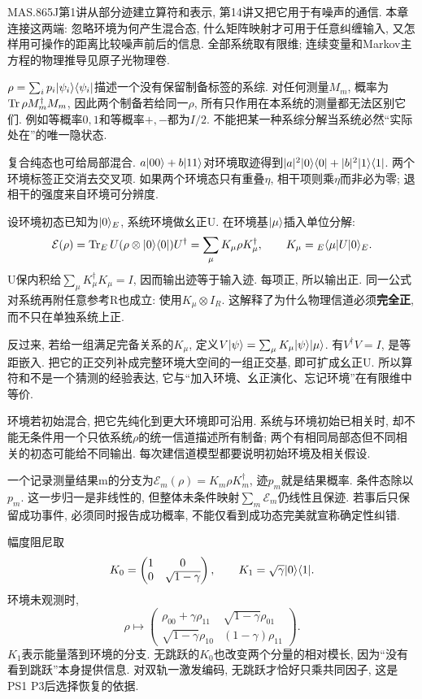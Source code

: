 MAS.865J第1讲从部分迹建立算符和表示, 第14讲又把它用于有噪声的通信. 本章连接这两端: 忽略环境为何产生混合态, 什么矩阵映射才可用于任意纠缠输入, 又怎样用可操作的距离比较噪声前后的信息. 全部系统取有限维; 连续变量和Markov主方程的物理推导见原子光物理卷.

$\rho=\sum_ip_i\lvert \psi_i\rangle\langle \psi_i\rvert$描述一个没有保留制备标签的系综. 对任何测量$M_m$, 概率为$\operatorname{Tr}\rho M_m^\dagger M_m$, 因此两个制备若给同一$\rho$, 所有只作用在本系统的测量都无法区别它们. 例如等概率$0,1$和等概率$+,-$都为$I/2$. 不能把某一种系综分解当系统必然“实际处在”的唯一隐状态.

复合纯态也可给局部混合. $a\lvert 00\rangle+b\lvert 11\rangle$对环境取迹得到$|a|^2\lvert 0\rangle\langle 0\rvert+|b|^2\lvert 1\rangle\langle 1\rvert$. 两个环境标签正交消去交叉项. 如果两个环境态只有重叠$\eta$, 相干项则乘$\eta$而非必为零; 退相干的强度来自环境可分辨度.

设环境初态已知为$\lvert 0\rangle_E$, 系统环境做幺正U. 在环境基$\lvert \mu\rangle$插入单位分解:
\[\mathcal E(\rho)=\operatorname{Tr}_E U(\rho\otimes\lvert 0\rangle\langle 0\rvert)U^\dagger
=\sum_\mu K_\mu\rho K_\mu^\dagger,\qquad K_\mu={}_E\langle \mu\rvert U\lvert 0\rangle_E.\]
U保内积给$\sum_\mu K_\mu^\dagger K_\mu=I$, 因而输出迹等于输入迹. 每项正, 所以输出正. 同一公式对系统再附任意参考R也成立: 使用$K_\mu\otimes I_R$. 这解释了为什么物理信道必须\textbf{完全正}, 而不只在单独系统上正.

反过来, 若给一组满足完备关系的$K_\mu$, 定义$V\lvert \psi\rangle=\sum_\mu K_\mu\lvert \psi\rangle\lvert \mu\rangle$. 有$V^\dagger V=I$, 是等距嵌入. 把它的正交列补成完整环境大空间的一组正交基, 即可扩成幺正U. 所以算符和不是一个猜测的经验表达, 它与“加入环境、幺正演化、忘记环境”在有限维中等价.

环境若初始混合, 把它先纯化到更大环境即可沿用. 系统与环境初始已相关时, 却不能无条件用一个只依系统$\rho$的统一信道描述所有制备; 两个有相同局部态但不同相关的初态可能给不同输出. 每次建信道模型都要说明初始环境及相关假设.

一个记录测量结果m的分支为$\mathcal E_m(\rho)=K_m\rho K_m^\dagger$, 迹$p_m$就是结果概率. 条件态除以$p_m$. 这一步归一是非线性的, 但整体未条件映射$\sum_m\mathcal E_m$仍线性且保迹. 若事后只保留成功事件, 必须同时报告成功概率, 不能仅看到成功态完美就宣称确定性纠错.

\begin{example}幅度阻尼取
\[K_0=\begin{pmatrix}1&0\\0&\sqrt{1-\gamma}\end{pmatrix},\qquad
K_1=\sqrt\gamma\lvert 0\rangle\langle 1\rvert.\]
环境未观测时,
\[\rho\longmapsto\begin{pmatrix}\rho_{00}+\gamma\rho_{11}&\sqrt{1-\gamma}\rho_{01}\\\sqrt{1-\gamma}\rho_{10}&(1-\gamma)\rho_{11}\end{pmatrix}.\]
$K_1$表示能量落到环境的分支. 无跳跃的$K_0$也改变两个分量的相对模长, 因为“没有看到跳跃”本身提供信息. 对双轨一激发编码, 无跳跃才恰好只乘共同因子, 这是PS1 P3后选择恢复的依据.\end{example}

